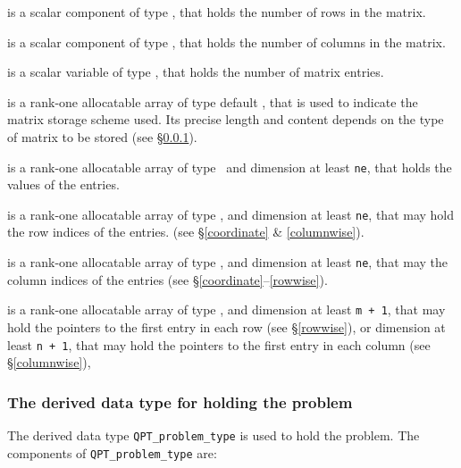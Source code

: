 \documentclass{galahad}
\begin{document}
\begin{description}

 is a scalar component of type \integer,
that holds the number of rows in the matrix.

 is a scalar component of type \integer,
that holds the number of columns in the matrix.

 is a scalar variable of type \integer, that
holds the number of matrix entries.

 is a rank-one allocatable array of type default \character, that
is used to indicate the matrix storage scheme used. Its precise length and
content depends on the type of matrix to be stored (see \S\ref{typeprob}).

 is a rank-one allocatable array of type \realdp\,
and dimension at least {\tt ne}, that holds the values of the entries.

 is a rank-one allocatable array of type \integer,
and dimension at least {\tt ne}, that may hold the row indices of the entries.
(see \S\ref{coordinate} \& \ref{columnwise}).

 is a rank-one allocatable array of type \integer,
and dimension at least {\tt ne}, that may the column indices of the entries
(see \S\ref{coordinate}--\ref{rowwise}).

 is a rank-one allocatable array of type \integer,
and dimension at least {\tt m + 1}, that may hold the pointers to
the first entry in each row (see \S\ref{rowwise}),
or dimension at least {\tt n + 1}, that may hold the pointers to
the first entry in each column (see \S\ref{columnwise}),

\end{description}


\subsubsection{The derived data type for holding the problem}\label{typeprob}
The derived data type {\tt QPT\_problem\_type} is used to hold
the problem. The components of
{\tt QPT\_problem\_type}
are:
\end{document}
